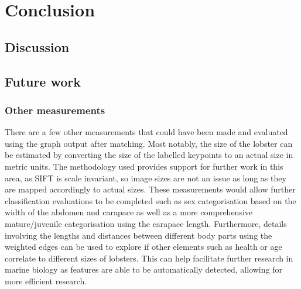 \section{Conclusion}
\newcommand{\comment}[1]{}

\subsection{Discussion}

\subsection{Future work}
\subsubsection{Other measurements}
There are a few other measurements that could have been made and evaluated using the graph output after matching. Most notably, the size of the lobster can be estimated by converting the size of the labelled keypoints to an actual size in metric units. The methodology used provides support for further work in this area, as SIFT is scale invariant, so image sizes are not an issue as long as they are mapped accordingly to actual sizes. These measurements would allow further classification evaluations to be completed such as sex categorisation based on the width of the abdomen and carapace \cite{lobster-video} as well as a more comprehensive mature/juvenile categorisation using the carapace length. Furthermore, details involving the lengths and distances between different body parts using the weighted edges can be used to explore if other elements such as health or age correlate to different sizes of lobsters. This can help facilitate further research in marine biology as features are able to be automatically detected, allowing for more efficient research. 

\comment{
- Size of nodes and length of edges can be used to estimate actual size of lobster, given calculations with resolution of image
}
